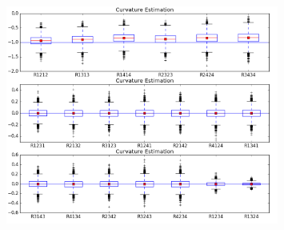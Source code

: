 \documentclass{article}
\begin{document}
\begin{figure}[htbp]
\centering
\includegraphics[width=0.8\textwidth]{sphere4d.png}
\end{figure}
\end{document}
